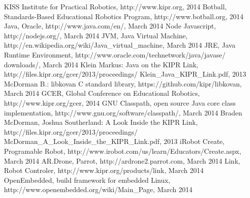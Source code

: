 \documentclass{juniorjournal}
\begin{document}
\begin{thebibliography}{500} %
  KISS Institute for Practical Robotics,
  http://www.kipr.org, 2014
  Botball, Standards-Based Educational Robotics Program, 
  http://www.botball.org, 2014
  Java, Oracle,
  http://www.java.com/en/, March 2014
  Node Javascript, 
  http://nodejs.org/, March 2014
  JVM, Java Virtual Machine,
  http://en.wikipedia.org/wiki/Java\_virtual\_machine, March 2014
  JRE, Java Runtime Environment, 
  http://www.oracle.com/technetwork/java/javase/
  downloads/, March 2014
  Klein Markus: \frqq Java on the KIPR Link\flqq  ,
  http://files.kipr.org/gcer/2013/proceedings/
  Klein\_Java\_KIPR\_Link.pdf, 2013
  McDorman B.: libkovan C standard library,
  https://github.com/kipr/libkovan, March 2014
  GCER, Global Conference on Educational Robotics,
  http://www.kipr.org/gcer, 2014
  GNU Classpath, open source Java core class implementation,
  http://www.gnu.org/software/classpath/, March 2014
  Braden McDorman, Joshua Southerland: \frqq A Look Inside the KIPR Link\flqq  ,
  http://files.kipr.org/gcer/2013/proceedings/
  McDorman\_A\_Look\_Inside\_the\_KIPR\_Link.pdf, 2013
  iRobot Create, Programable Robot,
  http://www.irobot.com/us/learn/Educators/Create.aspx, March 2014
  AR.Drone, Parrot,
  http://ardrone2.parrot.com, March 2014
  Link, Robot Controler,
  http://www.kipr.org/products/link, March 2014
  OpenEmbedded, build framework for embedded Linux,
  http://www.openembedded.org/wiki/Main\_Page, March 2014
\end{thebibliography}
\end{document}
